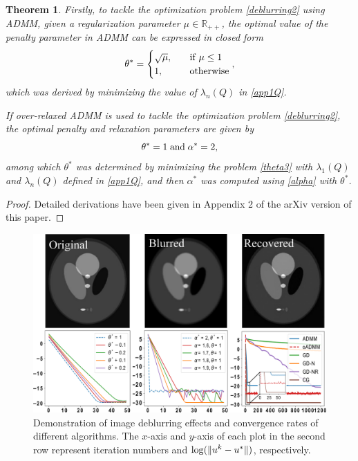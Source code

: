 \documentclass[letterpaper]{article} %
\newtheorem{theorem}{Theorem}
\begin{document}
\begin{theorem}
Firstly, to tackle the optimization problem \eqref{deblurring2} using ADMM, given a regularization parameter $\mu\in \mathbb{R}_{++}$, the optimal value of the penalty parameter in ADMM can be expressed in closed form
\begin{equation*}
	\theta^*=
	\begin{cases}
		\sqrt{\mu},\quad & {\rm{if}}\;\mu \leq 1 \\
		1,\quad & \text{otherwise}
	\end{cases},
\end{equation*}
which was derived by minimizing the value of $\lambda_n (Q)$ in \eqref{app1Q}. 

If over-relaxed ADMM is used to tackle the optimization problem \eqref{deblurring2}, the optimal penalty and relaxation parameters are given by
\begin{equation*}
	\theta^*=1 \; \rm{and} \; \alpha^*=2,
\end{equation*}
among which $\theta^*$ was determined by minimizing the problem \eqref{theta3} with $\lambda_1(Q)$ and $\lambda_n(Q)$ defined in \eqref{app1Q}, and then $\alpha^*$ was computed using \eqref{alpha} with $\theta^*$.
\end{theorem}

\begin{proof}
Detailed derivations have been given in  Appendix 2 of the arXiv version of this paper. 
\end{proof}

\begin{figure}[t]
	\centering
        \includegraphics[width=1.0\linewidth]{Figures/n11.pdf}
        \vspace{-15pt}
	\caption{{Demonstration of image deblurring effects and convergence rates of different algorithms. The $x$-axis and $y$-axis of each plot in the second row represent iteration numbers and ${\rm{log}}(\|u^k - u^*\|)$, respectively. } }
	\label{fig:2}
 \vspace{-10pt}
\end{figure} 
\end{document}
